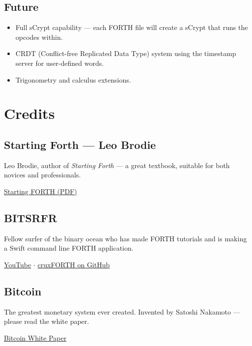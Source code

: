 \documentclass[a4paper, 11pt, openany]{book}
\begin{document}
\section{Future}

\begin{itemize}
\item Full sCrypt capability --- each FORTH file will create a sCrypt that runs the opcodes within.
\item CRDT (Conflict-free Replicated Data Type) system using the timestamp server for user-defined words.
\item Trigonometry and calculus extensions.
\end{itemize}

\chapter{Credits}

\section{Starting Forth --- Leo Brodie}

Leo Brodie, author of \emph{Starting Forth} --- a great textbook, suitable for both novices and professionals.

\href{https://1scyem2bunjw1ghzsf1cjwwn-wpengine.netdna-ssl.com/wp-content/uploads/2018/01/Starting-FORTH.pdf}{Starting FORTH (PDF)}

\section{BITSRFR}

Fellow surfer of the binary ocean who has made FORTH tutorials and is making a Swift command line FORTH application.

\href{https://www.youtube.com/user/JoeKreydt}{YouTube} \(\cdot\) \href{https://github.com/josephkreydt/cruxForth}{cruxFORTH on GitHub}

\section{Bitcoin}

The greatest monetary system ever created. Invented by Satoshi Nakamoto --- please read the white paper.

\href{https://craigwright.net/bitcoin-white-paper.pdf}{Bitcoin White Paper}
\end{document}

